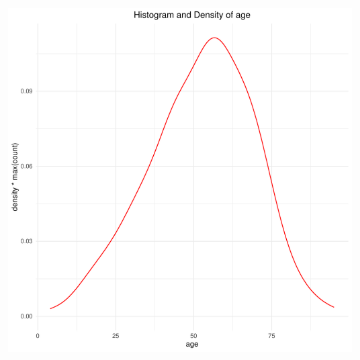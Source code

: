 \begin{enumerate}
\begin{figure}[h]
\begin{subfigure}[b]{0.49\textwidth}
\end{subfigure} 
\begin{subfigure}[b]{0.49\textwidth}
    \includegraphics[width=\textwidth]{Basses_kode/Billeder_duration/Histogram_and_Density_of_ age .pdf}
\end{subfigure}  
\end{figure}


\end{enumerate}
